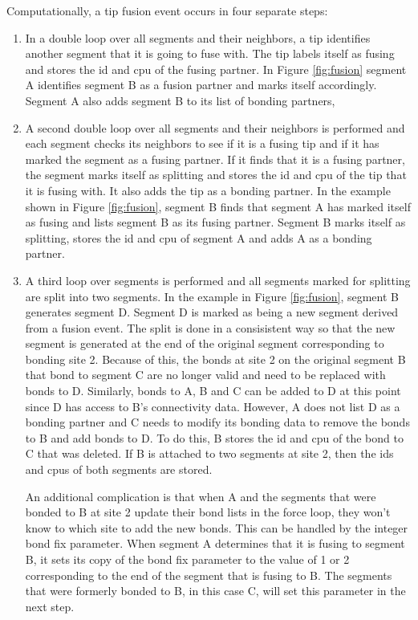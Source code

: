 \documentclass[12pt]{article}
\begin{document}
Computationally, a tip fusion event occurs in four separate steps:
\begin{enumerate}
\item In a double loop over all segments and their neighbors, a tip identifies another segment
that it is going to fuse with. The tip labels itself as fusing and stores the id and cpu of the
fusing partner. In Figure \ref{fig:fusion} segment A identifies segment B as a fusion partner
and marks itself accordingly. Segment A also adds segment B to its list of bonding partners,
\item A second double loop over all segments and their neighbors is performed and each segment
checks its neighbors to see if it is a fusing tip and if it has marked the segment as a fusing
partner. If it finds that it is a fusing partner, the segment marks itself as splitting and
stores the id and cpu of the tip that it is fusing with. It also adds the tip as a bonding
partner. In the example shown in Figure \ref{fig:fusion}, segment B finds that segment A has
marked itself as fusing and lists segment B as its fusing partner. Segment B marks itself as
splitting, stores the id and cpu of segment A and adds A as a bonding partner.
\item A third loop over segments is performed and all segments marked for splitting are split
into two segments. In the example in Figure \ref{fig:fusion}, segment B generates segment D.
Segment D is marked as being a new segment derived from a fusion event.
The split is done in a consisistent way so that the new segment is generated at the end of the
original segment corresponding to bonding site 2. Because of this, the bonds at site 2 on the
original segment B that bond to segment C are no longer valid and need to be replaced with bonds to D.
Similarly, bonds to A, B and C can be added to D at this point since D has access to B's
connectivity data. However, A does not list D as a bonding partner and C needs to modify its
bonding data to remove the bonds to B and add bonds to D. To do this, B stores the id and cpu
of the bond to C that was deleted. If B is attached to two segments at site 2, then the ids and
cpus of both segments are stored.

An additional complication is that when A and the
segments that were bonded to B at site 2 update their bond lists in the force loop, they
won't know to which site to add the new bonds. This can be handled by the integer bond fix
parameter. When segment A determines that it is fusing to segment B, it sets its copy of the
bond fix parameter to the value of 1 or 2 corresponding to the end of the segment that is
fusing to B. The segments that were formerly bonded to B, in this case C, will set this
parameter in the next step.


\end{enumerate}
\end{document}
